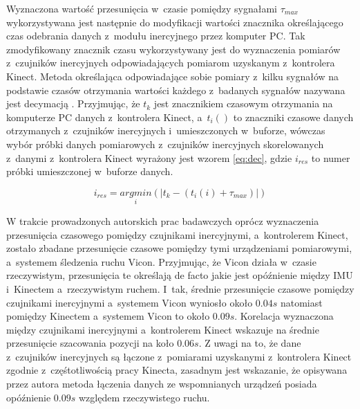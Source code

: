Wyznaczona wartość przesunięcia w~czasie pomiędzy sygnałami $\tau_{max}$ wykorzystywana jest następnie do modyfikacji wartości znacznika określającego czas odebrania danych z~modułu inercyjnego przez komputer PC. Tak zmodyfikowany znacznik czasu wykorzystywany jest do wyznaczenia pomiarów z~czujników inercyjnych odpowiadających pomiarom uzyskanym z~kontrolera Kinect. Metoda określająca odpowiadające sobie pomiary z~kilku sygnałów na podstawie czasów otrzymania wartości każdego z~badanych sygnałów nazywana jest decymacją \cite{Hinton2001}.
Przyjmując, że $t_k$ jest znacznikiem czasowym otrzymania na komputerze PC danych z~kontrolera Kinect, a~$t_i()$ to znaczniki czasowe danych  otrzymanych z~czujników inercyjnych i~umieszczonych w~buforze, wówczas wybór próbki danych pomiarowych z~czujników inercyjnych skorelowanych z~danymi z~kontrolera Kinect wyrażony jest wzorem \ref{eq:dec}, gdzie $i_{res}$ to numer próbki umieszczonej w~buforze danych.

\begin{equation}
	i_{res} = \underset{i}{argmin}(|t_k-(t_i(i) + \tau_{max})|)
	\label{eq:dec}
\end{equation}

W trakcie prowadzonych autorskich prac badawczych oprócz wyznaczenia przesunięcia czasowego pomiędzy czujnikami inercyjnymi, a~kontrolerem Kinect, zostało zbadane przesunięcie czasowe pomiędzy tymi urządzeniami pomiarowymi, a~systemem śledzenia ruchu Vicon. Przyjmując, że Vicon działa w~czasie rzeczywistym, przesunięcia te określają de facto jakie jest opóźnienie między IMU i~Kinectem a~rzeczywistym ruchem. I~tak, średnie przesunięcie czasowe pomiędzy czujnikami inercyjnymi a~systemem Vicon wyniosło około $0.04s$ natomiast pomiędzy Kinectem a~systemem Vicon to około $0.09s$. Korelacja wyznaczona między czujnikami inercyjnymi a~kontrolerem Kinect wskazuje na średnie przesunięcie szacowania pozycji na koło $0.06s$. Z uwagi na to, że dane z~czujników inercyjnych są łączone z~pomiarami uzyskanymi z~kontrolera Kinect zgodnie z~częśtotliwością pracy Kinecta, zasadnym jest wskazanie, że opisywana przez autora metoda łączenia danych ze wspomnianych urządzeń posiada opóźnienie $0.09s$ względem rzeczywistego ruchu.

